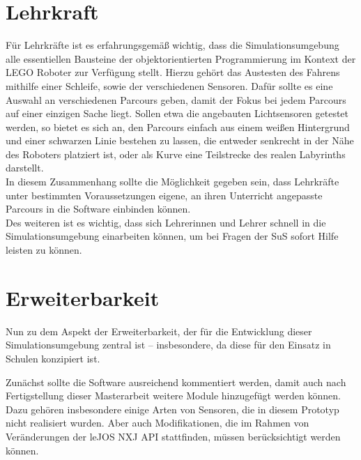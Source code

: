 \documentclass[paper=a4, DIV=calc, BCOR=15mm, twoside=on, onecolumn=on, open = right, titlepage =on, parskip =half, headsepline = on, footsepline = on, chapterprefix = off, appendixprefix = off, fontsize = 12pt, numbers = noenddot, abstract = on]{scrbook}
\begin{document}
\par \singlespacing
\section{Lehrkraft}
\label{sec:lehrkraft}
\par \onehalfspacing
Für Lehrkräfte ist es erfahrungsgemäß wichtig, dass die Simulationsumgebung alle essentiellen Bausteine der objektorientierten Programmierung im Kontext der \textsc{LEGO} Roboter zur Verfügung stellt. Hierzu gehört das Austesten des Fahrens mithilfe einer Schleife, sowie der verschiedenen Sensoren. Dafür sollte es eine Auswahl an verschiedenen Parcours geben, damit der Fokus bei jedem Parcours auf einer einzigen Sache liegt. Sollen etwa die angebauten Lichtsensoren getestet werden, so bietet es sich an, den Parcours einfach aus einem weißen Hintergrund und einer schwarzen Linie bestehen zu lassen, die entweder senkrecht in der Nähe des Roboters platziert ist, oder als Kurve eine Teilstrecke des realen Labyrinths darstellt.\\
In diesem Zusammenhang sollte die Möglichkeit gegeben sein, dass Lehrkräfte unter bestimmten Voraussetzungen eigene, an ihren Unterricht angepasste Parcours in die Software einbinden können.\\
Des weiteren ist es wichtig, dass sich Lehrerinnen und Lehrer schnell in die Simulationsumgebung einarbeiten können, um bei Fragen der SuS sofort Hilfe leisten zu können. %



\par \singlespacing
\section{Erweiterbarkeit} \label{sec:erweiterbarkeit}
\onehalfspacing
Nun zu dem Aspekt der Erweiterbarkeit, der für die Entwicklung dieser Simulationsumgebung zentral ist -- insbesondere, da diese für den Einsatz in Schulen konzipiert ist.

Zunächst sollte die Software ausreichend kommentiert werden, damit auch nach Fertigstellung dieser Masterarbeit weitere Module hinzugefügt werden können. Dazu gehören insbesondere einige Arten von Sensoren, die in diesem Prototyp nicht realisiert wurden. Aber auch Modifikationen, die im Rahmen von Veränderungen der leJOS NXJ API stattfinden, müssen berücksichtigt werden können.
\end{document}

